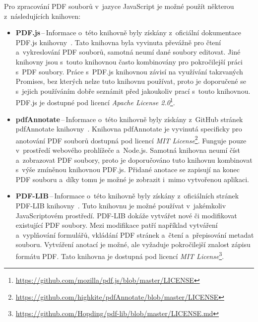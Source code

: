Pro zpracování PDF souborů v~jazyce JavaScript je možné použít některou
z~následujících knihoven:
\begin{itemize}
    \item \textbf{PDF.js}\,--\,Informace o~této knihovně byly získány
    z~oficiální dokumentace PDF.js knihovny~\cite{PDFjs}.
    Tato knihovna byla vyvinuta převážně pro čtení a~vykreslování PDF
    souborů, samotná neumí dané soubory editovat. Jiné knihovny jsou s~touto
    knihovnou často kombinovány pro pokročilejší práci s~PDF soubory. Práce
    s~PDF.js knihovnou závisí na využívání takzvaných Promises, bez kterých nelze
    tuto knihovnu používat, proto je doporučené se s~jejich používáním dobře
    seznámit před jakoukoliv prací s~touto knihovnou. PDF.js je dostupné pod
    licencí \emph{Apache License 2.0}\footnote{
    \href{https://github.com/mozilla/pdf.js/blob/master/LICENSE}{https://github.com/mozilla/pdf.js/blob/master/LICENSE}}.
    
    \item \textbf{pdfAnnotate}\,--\,Informace o~této knihovně byly získány
    z~GitHub stránek pdfAnnotate knihovny~\cite{pdfAnnotate}.
    Knihovna pdfAnnotate je vyvinutá specificky pro anotování PDF souborů dostupná pod
    licencí \emph{MIT License}\footnote{
    \href{https://github.com/highkite/pdfAnnotate/blob/master/LICENSE}{https://github.com/highkite/pdfAnnotate/blob/master/LICENSE}
    }. Funguje pouze v~prostředí webového prohlížeče a~Node.js. Samotná knihovna
    neumí číst a~zobrazovat PDF soubory, proto je doporučováno tuto knihovnu
    kombinovat s~výše zmíněnou knihovnou PDF.js. Přidané anotace se zapisují
    na konec PDF souboru a~díky tomu je možné je zobrazit i~mimo vytvořenou
    aplikaci.
    
    \item \textbf{PDF-LIB}\,--\,Informace o~této knihovně byly získány
    z~oficiálních stránek PDF-LIB knihovny~\cite{pdf_lib}.
    Tuto knihovnu je možné používat v~jakémkoliv JavaScriptovém prostředí.
    PDF-LIB dokáže vytvářet nové či modifikovat existující PDF soubory. Mezi
    modifikace patří například vytváření a~vyplňování formulářů, vkládání PDF
    stránek a~čtení a~přepisování metadat souboru. Vytváření anotací je možné, ale
    vyžaduje pokročilejší znalost zápisu formátu PDF. Tato knihovna je dostupná
    pod licencí \emph{MIT License}\footnote{
    \href{https://github.com/Hopding/pdf-lib/blob/master/LICENSE.md}{https://github.com/Hopding/pdf-lib/blob/master/LICENSE.md}
    }.
\end{itemize}


